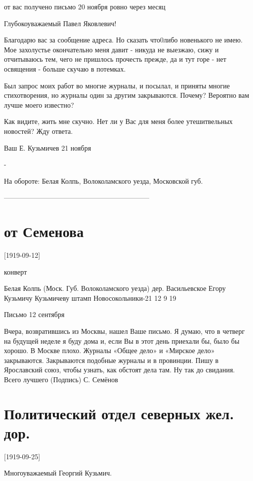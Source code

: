 \documentclass[]{memoir}
\begin{document}


от вас получено письмо 20 ноября ровно через месяц

Глубокоуважаемый Павел Яковлевич!

Благодарю вас за сообщение адреса. Но сказать что0либо новенького не имею. Мое захолустье окончательно меня давит - никуда не выезжаю, сижу и отчитываюсь тем, чего не пришлось прочесть прежде, да и тут горе - нет освящения - больше скучаю в потемках.

Был запрос моих работ во многие журналы, и посылал, и приняты многие стихотворения, но журналы один за другим закрываются. Почему? Вероятно вам лучше моего известно?

Как видите, жить мне скучно. Нет ли у Вас для меня более утешитвельных новостей? Жду ответа.

Ваш Е. Кузьмичев 21 ноября

-

На обороте: Белая Колпь, Волоколамского уезда, Московской губ.

---------------------------------------------------------------


\section{от Семенова}
        [1919-09-12]
        
        конверт
        
Белая Колпь
(Моск. Губ. Волоколамского уезда)
дер. Васильевское
Егору Кузьмичу Кузьмичеву
штамп 
Новосокольники-21
12  9  19

Письмо
12 сентября

Вчера, возвратившись из Москвы, нашел Ваше письмо. Я думаю, что в четверг на будущей неделе я буду дома и, если Вы в этот день приехали бы, было бы хорошо.
В Москве плохо. Журналы «Общее дело» и «Мирское дело» закрываются. Закрываются подобные журналы и в провинции. Пишу в Ярославский союз, чтобы узнать, как обстоят дела там.
Ну так до свидания.
Всего лучшего
(Подпись) С. Семёнов


\section{Политический отдел северных жел. дор.}

[1919-09-25]
        
Многоуважаемый Георгий Кузьмич.
\end{document}
